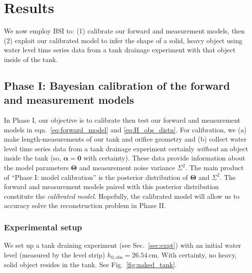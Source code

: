 \documentclass[openacc]{rsproca_new}%
\begin{document}
\section{Results}
We now employ BSI to:
(1) calibrate our forward and measurement models, then
(2) exploit our calibrated model to infer the shape of a solid, heavy object using water level time series data from a tank drainage experiment with that object inside of the tank.

\subsection{Phase I: Bayesian calibration of the forward and measurement models}
\label{sec:phaseI}
In Phase I, our objective is to calibrate then test our forward and measurement models in eqn.~\ref{eq:forward_model} and \ref{eq:H_obs_distn}.
For calibration, we (a) make length-measurements of our tank and orifice geometry and (b) collect water level time series data from a tank drainage experiment certainly \emph{without} an object inside the tank (so, $\boldsymbol \alpha = \mathbf{0}$ with certainty).
These data provide information about the model parameters $\boldsymbol \Theta$ and measurement noise variance $\Sigma^2$. 
The main product of ``Phase I: model calibration'' is the posterior distribution of $\boldsymbol \Theta$ and $\Sigma^2$.
The forward and measurement models paired with this posterior distribution constitute the \emph{calibrated model}. 
Hopefully, the calibrated model will allow us to accuracy solve the reconstruction problem in Phase II. 

\subsubsection{Experimental setup}
We set up a tank draining experiment (see Sec.~\ref{sec:expt}) with an initial water level (measured by the level strip) $h_{0, \text{obs}}=26.54$\,cm. 
With certainty, no heavy, solid object resides in the tank. 
See Fig.~\ref{fig:naked_tank}.
\end{document}
